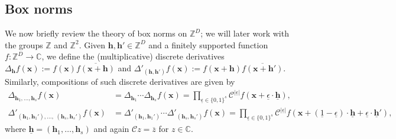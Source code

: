 \documentclass[11pt]{amsart}
\theoremstyle{definition}
\newcommand{\C}{{\mathbb C}}
\newcommand{\Z}{{\mathbb Z}}
\newcommand{\CC}{{\mathcal C}}
\newcommand{\bh}{{\mathbf{h}}}
\newcommand{\bx}{{\textbf{x}}}
\newcommand{\ubh}{{\underline{\textbf{h}}}}
\newcommand{\ueps}{{\underline{\epsilon}}}
\begin{document}
\subsection{Box norms}
We now briefly review the theory of box norms on $\Z^D$; we will later work with the groups $\Z$ and $\Z^2$.
Given $\bh, \bh'\in \Z^D$ and a finitely supported function $f: \Z^D\to\C$, we define
the (multiplicative) discrete derivatives
$\Delta_\bh f(\bx) := f(\bx)\overline{f(\bx+\bh)}$ and $\Delta'_{(\bh,\bh')} f(\bx) := f(\bx+\bh)\overline{f(\bx+\bh')}$.  Similarly, compositions of such discrete derivatives are given by
\begin{align*}
    \Delta_{\bh_1, \ldots, \bh_s}f(\bx) &= \Delta_{\bh_1}\cdots \Delta_{\bh_s}f(\bx) = \prod_{\ueps\in\{0,1\}^s}\CC^{|\ueps|}f(\bx+\ueps\cdot \ubh),\\
    \Delta'_{(\bh_1, \bh_1'), \ldots,\; (\bh_s,\bh_s')}f(\bx) &= \Delta'_{(\bh_1, \bh_1')}\cdots\Delta'_{(\bh_s, \bh_s')}f(\bx) = \prod_{\ueps\in\{0,1\}^s}\CC^{|\ueps|}f(\bx+(\underline{1}-\ueps)\cdot\ubh + \ueps\cdot\ubh'),
\end{align*}
where $\ubh = (\bh_1, \ldots, \bh_s)$ and again $\CC z = \overline{z}$ for $z\in\C$.
\end{document}
